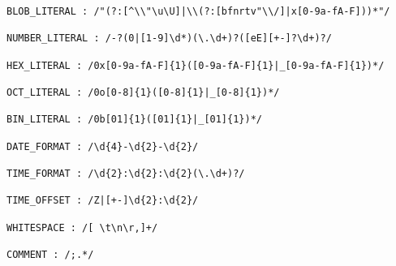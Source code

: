 \begin{apendicesenv}
\begin{lstlisting}[caption=Gramática do FRED,label={lst:fredgrammar}]
BLOB_LITERAL : /"(?:[^\\"\u\U]|\\(?:[bfnrtv"\\/]|x[0-9a-fA-F]))*"/

NUMBER_LITERAL : /-?(0|[1-9]\d*)(\.\d+)?([eE][+-]?\d+)?/

HEX_LITERAL : /0x[0-9a-fA-F]{1}([0-9a-fA-F]{1}|_[0-9a-fA-F]{1})*/

OCT_LITERAL : /0o[0-8]{1}([0-8]{1}|_[0-8]{1})*/

BIN_LITERAL : /0b[01]{1}([01]{1}|_[01]{1})*/

DATE_FORMAT : /\d{4}-\d{2}-\d{2}/

TIME_FORMAT : /\d{2}:\d{2}:\d{2}(\.\d+)?/

TIME_OFFSET : /Z|[+-]\d{2}:\d{2}/

WHITESPACE : /[ \t\n\r,]+/

COMMENT : /;.*/
\end{lstlisting}
    
\end{apendicesenv}
